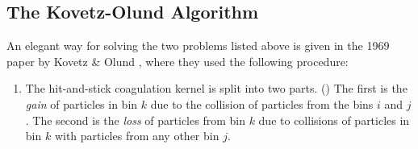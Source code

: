     \clearpage\subsection{The Kovetz-Olund Algorithm}
        
        An elegant way for solving the two problems listed above is given in the 1969 paper
        by Kovetz \& Olund \cite{kovetz_olund_1969}, where they used the following procedure:
        \begin{enumerate}
            \item The hit-and-stick coagulation kernel is split into two parts. 
                ()
                The first is the \textit{gain} of particles in bin $k$ due to the collision of 
                particles from the bins $i$ and $j$. The second is the \textit{loss} of particles 
                from bin $k$ due to collisions of particles in bin $k$ with particles from any 
                other bin $j$.
            

\end{enumerate}
